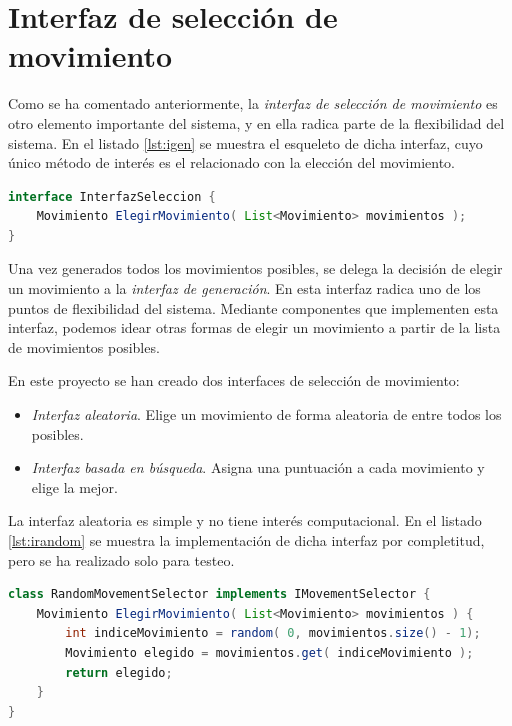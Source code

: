 \section{Interfaz de selección de movimiento}

Como se ha comentado anteriormente, la \emph{interfaz de selección de movimiento} es otro elemento importante del sistema, y en ella radica parte de la flexibilidad del sistema. En el listado \ref{lst:igen} se muestra el esqueleto de dicha interfaz, cuyo único método de interés es el relacionado con la elección del movimiento.

\begin{lstlisting}[caption={Interfaz de generación},label={lst:igen},language=Java,escapechar=|]
interface InterfazSeleccion {
	Movimiento ElegirMovimiento( List<Movimiento> movimientos );
}
\end{lstlisting}

Una vez generados todos los movimientos posibles, se delega la decisión de elegir un movimiento a la \emph{interfaz de generación}. En esta interfaz radica uno de los puntos de flexibilidad del sistema. Mediante componentes que implementen esta interfaz, podemos idear otras formas de elegir un movimiento a partir de la lista de movimientos posibles.

En este proyecto se han creado dos interfaces de selección de movimiento:

\begin{itemize}
	\item \emph{Interfaz aleatoria}. Elige un movimiento de forma aleatoria de entre todos los posibles.
	\item \emph{Interfaz basada en búsqueda}. Asigna una puntuación a cada movimiento y elige la mejor.
\end{itemize}

La interfaz aleatoria es simple y no tiene interés computacional. En el listado \ref{lst:irandom} se muestra la implementación de dicha interfaz por completitud, pero se ha realizado solo para testeo.

\begin{lstlisting}[caption={Implementación aleatoria de la interfaz de selección de movimiento},label={lst:irandom},language=Java,escapechar=|]
class RandomMovementSelector implements IMovementSelector {
	Movimiento ElegirMovimiento( List<Movimiento> movimientos ) {
		int indiceMovimiento = random( 0, movimientos.size() - 1);
		Movimiento elegido = movimientos.get( indiceMovimiento );
		return elegido;
	}
}
\end{lstlisting}

